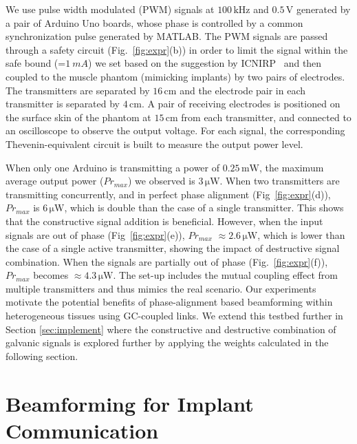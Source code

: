 We use pulse width modulated (PWM) signals at $100\, \mathrm{kHz}$ and $0.5\,\mathrm{V}$ generated by a pair of Arduino Uno boards, whose phase is controlled by a common synchronization pulse generated by MATLAB. The PWM signals are passed through a safety circuit (Fig.~\ref{fig:expr}(b)) in order to limit the signal within the safe bound (=$1 \ mA$) we set based on the suggestion by ICNIRP~\cite{ICNIRP} %
and then coupled to the muscle phantom (mimicking implants) by two pairs of electrodes. The transmitters are separated by $16\,\mathrm{cm}$ and the electrode pair in each transmitter is separated by $4\,\mathrm{cm}$. A pair of receiving electrodes is positioned on the surface skin of the phantom at $15\,\mathrm{cm}$ from each transmitter, and connected to an oscilloscope to observe the output voltage. For each signal, the corresponding Thevenin-equivalent circuit is built to measure the output power level. 

When only one Arduino is transmitting a power of $0.25\,\mathrm{mW}$, the maximum average output power ($Pr_{max}$) we observed is $3\,\mathrm{\mu W}$. When two transmitters are transmitting concurrently, and in perfect phase alignment (Fig~\ref{fig:expr}(d)), $Pr_{max}$ is $6\,\mathrm{\mu W}$, which is double than the case of a single transmitter. This shows that the constructive signal addition is beneficial. However, when the input signals are out of phase (Fig~\ref{fig:expr}(e)), $Pr_{max}$ $\approx 2.6\,\mathrm{\mu W}$, which is lower than the case of a single active transmitter, showing the impact of destructive signal combination. When the signals are partially out of phase (Fig.~\ref{fig:expr}(f)), $Pr_{max}$ becomes $ \approx 4.3\,\mathrm{\mu W}$. The set-up includes the mutual coupling effect from multiple transmitters and thus mimics the real scenario. Our experiments motivate the potential benefits of phase-alignment based beamforming within heterogeneous tissues using GC-coupled links. We extend this testbed further in Section \ref{sec:implement} where the constructive and destructive combination of galvanic signals is explored further by applying the weights calculated in the following section.  %

\section{Beamforming for Implant Communication} \label{sec:bf}

